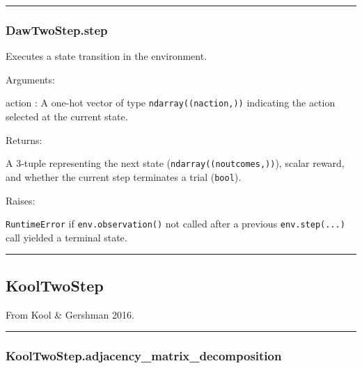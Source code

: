 \begin{center}\rule{0.5\linewidth}{\linethickness}\end{center}

\subsubsection{DawTwoStep.step}\label{dawtwostep.step}

\begin{Shaded}
\begin{Highlighting}[]
\end{Highlighting}
\end{Shaded}

Executes a state transition in the environment.

Arguments:

action : A one-hot vector of type \texttt{ndarray((naction,))}
indicating the action selected at the current state.

Returns:

A 3-tuple representing the next state (\texttt{ndarray((noutcomes,))}),
scalar reward, and whether the current step terminates a trial
(\texttt{bool}).

Raises:

\texttt{RuntimeError} if \texttt{env.observation()} not called after a
previous \texttt{env.step(...)} call yielded a terminal state.

\begin{center}\rule{0.5\linewidth}{\linethickness}\end{center}

\subsection{KoolTwoStep}\label{kooltwostep}

\begin{Shaded}
\begin{Highlighting}[]
\end{Highlighting}
\end{Shaded}

From Kool \& Gershman 2016.

\begin{center}\rule{0.5\linewidth}{\linethickness}\end{center}

\subsubsection{KoolTwoStep.adjacency\_matrix\_decomposition}\label{kooltwostep.adjacency_matrix_decomposition}

